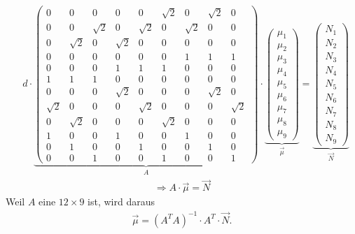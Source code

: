 \begin{align}
&d \cdot
	\underbrace{
	\begin{pmatrix}
		0 & 0 & 0  & 0 & 0 & \sqrt{2} & 0  & \sqrt{2} & 0\\
		 0&0  &\sqrt{2} & 0 & \sqrt{2} & 0 & \sqrt{2} & 0 & 0\\
		 0& \sqrt{2} & 0 & \sqrt{2} & 0 &0 &0  &0  &0 \\
		0&0 &0 &0 &0 &0 & 1 & 1 & 1\\
		0&0 &0 & 1 & 1 & 1 &0 &0 &0 \\
		1 & 1& 1 & 0&0 &0 &0 &0 &0\\
		0&0 &0 & \sqrt{2} & 0 &0 &0& \sqrt{2} &0\\
		\sqrt{2} & 0 & 0& 0 &\sqrt{2} &0 &0 &0 &\sqrt{2}\\
		0 & \sqrt{2} & 0 & 0 & 0 & \sqrt{2} & 0 & 0 &0\\
		1 &0 &0  &1 &0 &0 & 1 & 0 &0 \\
		0 & 1 & 0 & 0 & 1 & 0 & 0 & 1 &0 \\
		0 & 0& 1 & 0 & 0 & 1 & 0 & 0 & 1
	\end{pmatrix}
	}_{A}
	\cdot
	\underbrace{
	\begin{pmatrix}
		\mu_1\\
		\mu_2\\
		\mu_3\\
		\mu_4\\
		\mu_5\\
		\mu_6\\
		\mu_7\\
		\mu_8\\
		\mu_9
	\end{pmatrix}
	}_{\vec{\mu}}
	=
	\underbrace{
	\begin{pmatrix}
		N_1\\
		N_2\\
		N_3\\
		N_4\\
		N_5\\
		N_6\\
		N_7\\
		N_8\\
		N_9		
	\end{pmatrix}
	}_{\vec{N}}\nonumber
\end{align}
\begin{align}	
	\Rightarrow A\cdot\vec{\mu}=\vec{N}
\end{align}
Weil $A$ eine $12\times 9 $ ist, wird daraus
\begin{align}
	\vec{\mu}=\left(A^TA\right)^{-1}\cdot A^T\cdot\vec{N}.
	\label{eq:KleinsteQuadrate}
\end{align}
